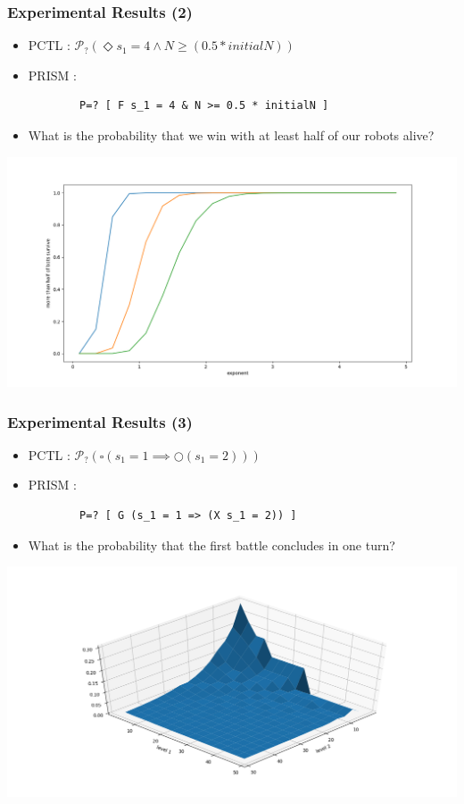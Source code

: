 \documentclass{beamer}
\theoremstyle{definition}
\begin{document}
\begin{frame}[fragile]
    \frametitle{Experimental Results (2)}
    \scriptsize

    \begin{itemize}
        \item PCTL : $ \mathcal{P}_{?} (\Diamond s_1 = 4 \wedge N \geq (0.5 * initialN)) $
        \item 
            PRISM : 
            \begin{lstlisting} 
        P=? [ F s_1 = 4 & N >= 0.5 * initialN ]
            \end{lstlisting}
        \item What is the probability that we win with at least half of our robots alive?
    \end{itemize}
    \includegraphics[width=\textwidth]{../figs/fig2.png}
\end{frame}

\begin{frame}[fragile]
    \frametitle{Experimental Results (3)}
    \scriptsize

    \begin{itemize}
        \item PCTL : $ \mathcal{P}_{?} (\square (s_1 = 1 \implies \bigcirc (s_1 = 2))) $
        \item 
            PRISM : 
            \begin{lstlisting} 
        P=? [ G (s_1 = 1 => (X s_1 = 2)) ]
            \end{lstlisting}
        \item What is the probability that the first battle concludes in one turn?
    \end{itemize}
    \includegraphics[width=\textwidth]{../figs/surface.png}
\end{frame}
\end{document}
